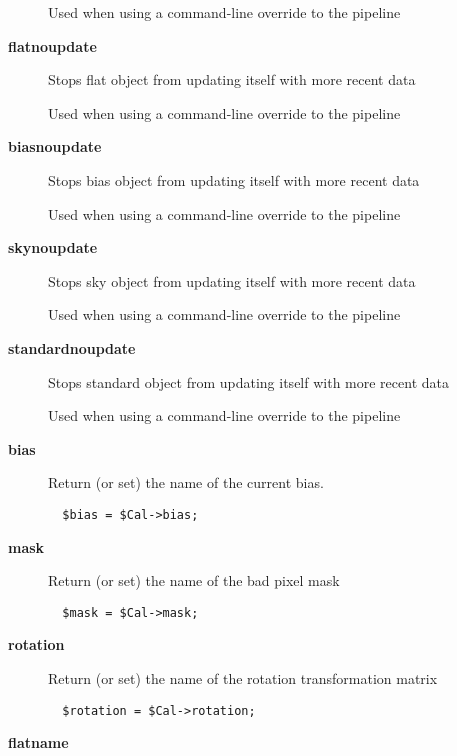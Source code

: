 \begin{description}
Used when using a command-line override to the pipeline

\item[\textbf{flatnoupdate}] \mbox{}

Stops flat object from updating itself with more recent data



Used when using a command-line override to the pipeline

\item[\textbf{biasnoupdate}] \mbox{}

Stops bias object from updating itself with more recent data



Used when using a command-line override to the pipeline

\item[\textbf{skynoupdate}] \mbox{}

Stops sky object from updating itself with more recent data



Used when using a command-line override to the pipeline

\item[\textbf{standardnoupdate}] \mbox{}

Stops standard object from updating itself with more recent data



Used when using a command-line override to the pipeline

\item[\textbf{bias}] \mbox{}

Return (or set) the name of the current bias.

\begin{verbatim}
  $bias = $Cal->bias;
\end{verbatim}
\item[\textbf{mask}] \mbox{}

Return (or set) the name of the bad pixel mask

\begin{verbatim}
  $mask = $Cal->mask;
\end{verbatim}
\item[\textbf{rotation}] \mbox{}

Return (or set) the name of the rotation transformation matrix

\begin{verbatim}
  $rotation = $Cal->rotation;
\end{verbatim}
\item[\textbf{flatname}] \mbox{}


\end{description}
